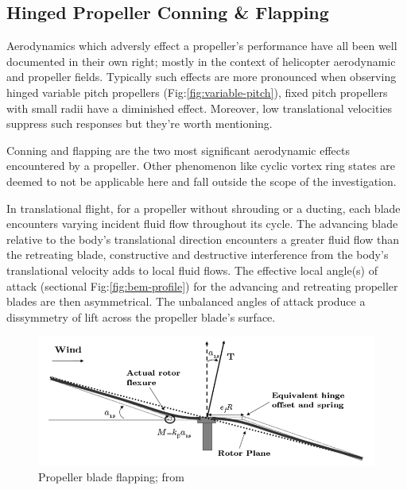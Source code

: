 \subsection{Hinged Propeller Conning \& Flapping}
\label{subsec:dynamics.aero.flap}
Aerodynamics which adversly effect a propeller's performance have all been well documented in their own right; mostly in the context of helicopter aerodynamic and propeller fields\cite{basichelicopter,bramwell}. Typically such effects are more pronounced when observing hinged variable pitch propellers (Fig:\ref{fig:variable-pitch}), fixed pitch propellers with small radii have a diminished effect. Moreover, low translational velocities suppress such responses but they're worth mentioning.
\par
Conning and flapping are the two most significant aerodynamic effects encountered by a propeller. Other phenomenon like cyclic vortex ring states are deemed to not be applicable here and fall outside the scope of the investigation. 
\par
In translational flight, for a propeller without shrouding or a ducting, each blade encounters varying incident fluid flow throughout its cycle. The advancing blade relative to the body's translational direction encounters a greater fluid flow than the retreating blade, constructive and destructive interference from the body's translational velocity adds to local fluid flows. The effective local angle(s) of attack (sectional Fig:\ref{fig:bem-profile}) for the advancing and retreating propeller blades are then asymmetrical. The unbalanced angles of attack produce a dissymmetry of lift across the propeller blade's surface.
\par
\begin{figure}[htbp]
\centering
\includegraphics[width=\textwidth]{figs/prop-flap}
\caption{Propeller blade flapping; from \cite{starmac}}
\label{fig:prop-flap}
\end{figure}
\par
